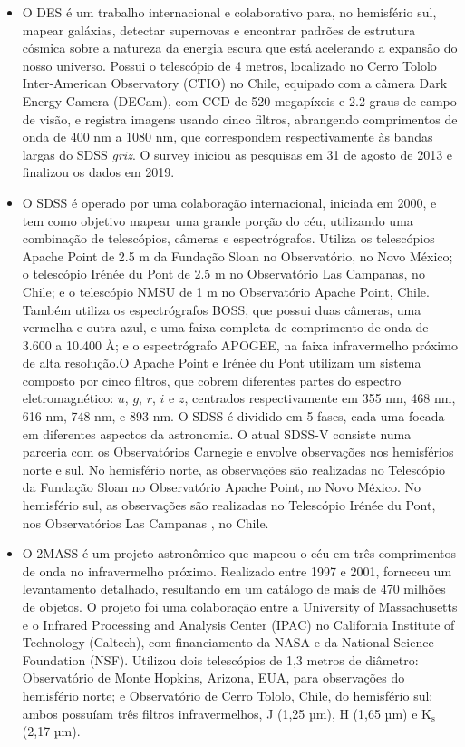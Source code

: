 \begin{itemize}
  \item O DES é um trabalho internacional e colaborativo para, no hemisfério sul, mapear galáxias, detectar supernovas e encontrar padrões de estrutura cósmica sobre a natureza da energia escura que está acelerando a expansão do nosso universo. Possui o telescópio de 4 metros, localizado no Cerro Tololo Inter-American Observatory (CTIO) no Chile, equipado com a câmera Dark Energy Camera (DECam), com CCD de 520 megapíxeis e 2.2 graus de campo de visão, e registra imagens usando cinco filtros, abrangendo comprimentos de onda de 400 nm a 1080 nm, que correspondem respectivamente às bandas largas do SDSS \emph{griz}. O survey iniciou as pesquisas em 31 de agosto de 2013 e finalizou os dados em 2019.
  \item O SDSS é operado por uma colaboração internacional, iniciada em 2000, e tem como objetivo mapear uma grande porção do céu, utilizando uma combinação de telescópios, câmeras e espectrógrafos. Utiliza os telescópios Apache Point de 2.5 m da Fundação Sloan no Observatório, no Novo México; o telescópio Irénée du Pont de 2.5 m no Observatório Las Campanas, no Chile; e o telescópio NMSU de 1 m no Observatório Apache Point, Chile. Também utiliza os espectrógrafos BOSS, que possui duas câmeras, uma vermelha e outra azul, e uma faixa completa de comprimento de onda de 3.600 a 10.400 Å; e o espectrógrafo APOGEE, na faixa infravermelho próximo de alta resolução.O Apache Point e Irénée du Pont utilizam um sistema composto por cinco filtros, que cobrem diferentes partes do espectro eletromagnético: $u$, $g$, $r$, $i$ e $z$, centrados respectivamente em 355 nm, 468 nm, 616 nm, 748 nm, e 893 nm. O SDSS é dividido em 5 fases, cada uma focada em diferentes aspectos da astronomia. O atual SDSS-V consiste numa parceria com os Observatórios Carnegie e envolve observações nos hemisférios norte e sul. No hemisfério norte, as observações são realizadas no Telescópio da Fundação Sloan no Observatório Apache Point, no Novo México. No hemisfério sul, as observações são realizadas no Telescópio Irénée du Pont, nos Observatórios Las Campanas , no Chile.
  \item O 2MASS é um projeto astronômico que mapeou o céu em três comprimentos de onda no infravermelho próximo. Realizado entre 1997 e 2001, forneceu um levantamento detalhado, resultando em um catálogo de mais de 470 milhões de objetos. O projeto foi uma colaboração entre a University of Massachusetts e o Infrared Processing and Analysis Center (IPAC) no California Institute of Technology (Caltech), com financiamento da NASA e da National Science Foundation (NSF). Utilizou dois telescópios de 1,3 metros de diâmetro: Observatório de Monte Hopkins, Arizona, EUA, para observações do hemisfério norte; e Observatório de Cerro Tololo, Chile, do hemisfério sul; ambos possuíam três filtros infravermelhos, J (1,25 µm), H (1,65 µm) e K$_\text{s}$ (2,17 µm).
\end{itemize}

